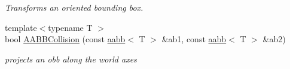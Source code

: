 \begin{DoxyCompactItemize}
\begin{DoxyCompactList}\small\item\em Transforms an oriented bounding box. \item\end{DoxyCompactList}\item 
{\footnotesize template$<$typename T $>$ }\\bool \hyperlink{group__geometric__primitives_gaa3201f1b56aca79d1fd12499f5c66e50}{AABBCollision} (const \hyperlink{classOpenRAVE_1_1geometry_1_1aabb}{aabb}$<$ T $>$ \&ab1, const \hyperlink{classOpenRAVE_1_1geometry_1_1aabb}{aabb}$<$ T $>$ \&ab2)
\begin{DoxyCompactList}\small\item\em projects an obb along the world axes \item\end{DoxyCompactList}\end{DoxyCompactItemize}
